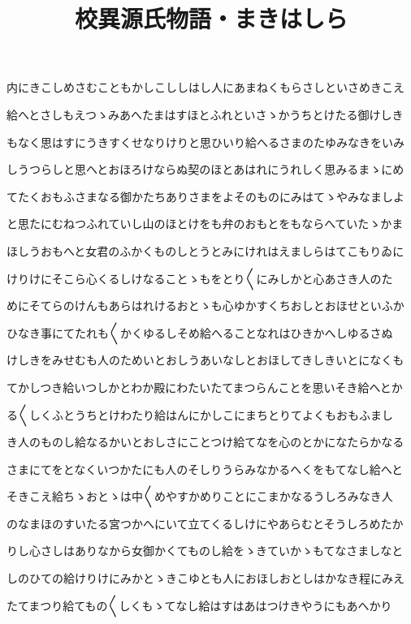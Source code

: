 \documentclass[a4paper,11pt,landscape]{ltjtarticle}
\title{校異源氏物語・まきはしら}
\date{}
\begin{document}
\maketitle

内にきこしめさむこともかしこししはし人にあまねくもらさしといさめきこえ
\par\medskip
給へとさしもえつゝみあへたまはすほとふれといさゝかうちとけたる御けしき
\par\medskip
もなく思はすにうきすくせなりけりと思ひいり給へるさまのたゆみなきをいみ
\par\medskip
しうつらしと思へとおほろけならぬ契のほとあはれにうれしく思みるまゝにめ
\par\medskip
てたくおもふさまなる御かたちありさまをよそのものにみはてゝやみなましよ
\par\medskip
と思たにむねつふれていし山のほとけをも弁のおもとをもならへていたゝかま
\par\medskip
ほしうおもへと女君のふかくものしとうとみにけれはえましらはてこもりゐに
\par\medskip
けりけにそこら心くるしけなることゝもをとり〱にみしかと心あさき人のた
\par\medskip
めにそてらのけんもあらはれけるおとゝも心ゆかすくちおしとおほせといふか
\par\medskip
ひなき事にてたれも〱かくゆるしそめ給へることなれはひきかへしゆるさぬ
\par\medskip
けしきをみせむも人のためいとおしうあいなしとおほしてきしきいとになくも
\par\medskip
てかしつき給いつしかとわか殿にわたいたてまつらんことを思いそき給へとか
\par\medskip
る〱しくふとうちとけわたり給はんにかしこにまちとりてよくもおもふまし
\par\medskip
き人のものし給なるかいとおしさにことつけ給てなを心のとかになたらかなる
\par\medskip
さまにてをとなくいつかたにも人のそしりうらみなかるへくをもてなし給へと
\par\medskip
そきこえ給ちゝおとゝは中〱めやすかめりことにこまかなるうしろみなき人
\par\medskip
のなまほのすいたる宮つかへにいて立てくるしけにやあらむとそうしろめたか
\par\medskip
りし心さしはありなから女御かくてものし給をゝきていかゝもてなさましなと
\par\medskip
しのひての給けりけにみかとゝきこゆとも人におほしおとしはかなき程にみえ
\par\medskip
たてまつり給てもの〱しくもゝてなし給はすはあはつけきやうにもあへかり
\end{document}

